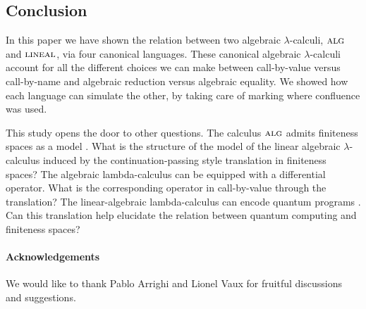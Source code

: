 \documentclass{LMCS}
\newcommand{\olin}{\mbox{\sc lineal}}
\newcommand{\oalg}{\mbox{\sc alg}}
\begin{document}
\subsection{Conclusion}
In this paper we have shown the relation between two algebraic
$\lambda$-calculi, $\oalg$ and $\olin$, via four canonical languages.
These canonical algebraic $\lambda$-calculi account for all the
different choices we can make between call-by-value versus
call-by-name and algebraic reduction versus algebraic equality. We
showed how each language can simulate the other, by taking care of
marking where confluence was used.

This study opens the door to other questions.  The calculus $\oalg$
admits finiteness spaces as a model
\cite{EhrhardMSCS05,EhrhardLICS10}. What is the structure of the model
of the linear algebraic $\lambda$-calculus induced by the
continuation-passing style translation in finiteness spaces? The
algebraic lambda-calculus can be equipped with a differential
operator.  What is the corresponding operator in call-by-value through
the translation?  The linear-algebraic lambda-calculus can encode
quantum programs \cite{ArrighiDiazcaroValiron13}. Can this translation
help elucidate the relation between quantum computing and finiteness
spaces?

\paragraph*{Acknowledgements} 
We would like to thank Pablo Arrighi and Lionel Vaux for fruitful discussions and suggestions.



\appendix



\newenvironment{myenumerate}{\begin{enumerate}[labelindent=0ex,labelwidth=3ex,labelsep=1.5ex,leftmargin=4.5ex,itemindent=0ex]}{\end{enumerate}}
\end{document}
